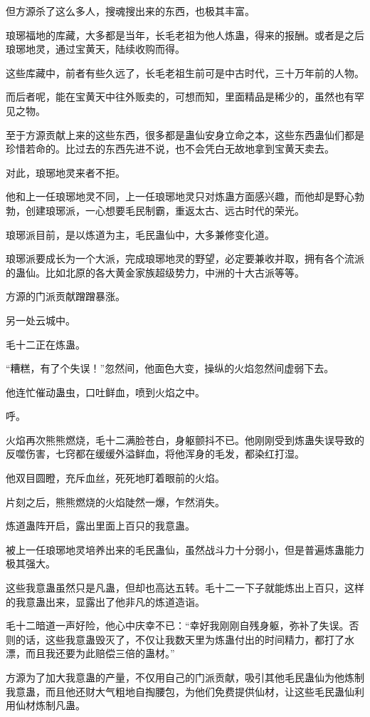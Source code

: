 \begin{this_body}
但方源杀了这么多人，搜魂搜出来的东西，也极其丰富。

琅琊福地的库藏，大多都是当年，长毛老祖为他人炼蛊，得来的报酬。或者是之后琅琊地灵，通过宝黄天，陆续收购而得。

这些库藏中，前者有些久远了，长毛老祖生前可是中古时代，三十万年前的人物。

而后者呢，能在宝黄天中往外贩卖的，可想而知，里面精品是稀少的，虽然也有罕见之物。

至于方源贡献上来的这些东西，很多都是蛊仙安身立命之本，这些东西蛊仙们都是珍惜若命的。比过去的东西先进不说，也不会凭白无故地拿到宝黄天卖去。

对此，琅琊地灵来者不拒。

他和上一任琅琊地灵不同，上一任琅琊地灵只对炼蛊方面感兴趣，而他却是野心勃勃，创建琅琊派，一心想要毛民制霸，重返太古、远古时代的荣光。

琅琊派目前，是以炼道为主，毛民蛊仙中，大多兼修变化道。

琅琊派要成长为一个大派，完成琅琊地灵的野望，必定要兼收并取，拥有各个流派的蛊仙。比如北原的各大黄金家族超级势力，中洲的十大古派等等。

方源的门派贡献蹭蹭暴涨。

另一处云城中。

毛十二正在炼蛊。

“糟糕，有了个失误！”忽然间，他面色大变，操纵的火焰忽然间虚弱下去。

他连忙催动蛊虫，口吐鲜血，喷到火焰之中。

呼。

火焰再次熊熊燃烧，毛十二满脸苍白，身躯颤抖不已。他刚刚受到炼蛊失误导致的反噬伤害，七窍都在缓缓外溢鲜血，将他浑身的毛发，都染红打湿。

他双目圆瞪，充斥血丝，死死地盯着眼前的火焰。

片刻之后，熊熊燃烧的火焰陡然一爆，乍然消失。

炼道蛊阵开启，露出里面上百只的我意蛊。

被上一任琅琊地灵培养出来的毛民蛊仙，虽然战斗力十分弱小，但是普遍炼蛊能力极其强大。

这些我意蛊虽然只是凡蛊，但却也高达五转。毛十二一下子就能炼出上百只，这样的我意蛊出来，显露出了他非凡的炼道造诣。

毛十二暗道一声好险，他心中庆幸不已：“幸好我刚刚自残身躯，弥补了失误。否则的话，这些我意蛊毁灭了，不仅让我数天里为炼蛊付出的时间精力，都打了水漂，而且我还要为此赔偿三倍的蛊材。”

方源为了加大我意蛊的产量，不仅用自己的门派贡献，吸引其他毛民蛊仙为他炼制我意蛊，而且他还财大气粗地自掏腰包，为他们免费提供仙材，让这些毛民蛊仙利用仙材炼制凡蛊。


\end{this_body}
